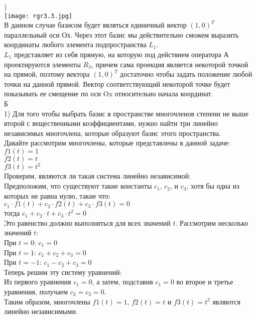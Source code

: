 \documentclass{article}
\begin{document}
    ) \\
    \texttt{[image: rgr3.3.jpg]}
    \\
    В данном случае базисом будет являться единичный вектор $(1, 0)^T$
    параллельный оси Ох. Через этот базис мы действительно сможем выразить координаты любого элемента подпространства $L_1$. \\ $L_1$ представляет из себя прямую, на которую под действием оператора $А$ проектируются элементы $R_3$, причем сама проекция является некоторой
    точкой на прямой, поэтому вектора $(1, 0)^T$ достаточно чтобы задать
    положение любой точки на данной прямой. Вектор соответствующий
    некоторой точке будет показывать ее смещение по оси Ox относительно
    начала координат. \\
    Б\\
    1) Для того чтобы выбрать базис в пространстве многочленов степени не
    выше второй с вещественными коэффициентами, нужно найти три
    линейно независимых многочлена, которые образуют базис этого
    пространства.\\
    Давайте рассмотрим многочлены, которые представлены в данной
    задаче:\\
    $f1(t) = 1$\\
    $f2(t) = t$\\
    $f3(t) = t^2$\\
    Проверим, являются ли такая система линейно независимой:\\
    Предположим, что существуют такие константы $c_1$, $c_2$, и $c_3$, хотя бы одна
    из которых не равна нулю, такие что:\\
    $c_1  \cdot  f1(t) + c_2  \cdot  f2(t) + c_3  \cdot  f3(t)=0$\\
    тогда $c_1 + c_2  \cdot  t+c_3  \cdot  t^2 = 0$\\
    Это равенство должно выполняться для всех значений $t$. Рассмотрим
    несколько значений $t$:\\
    При $t = 0$: $c_1 = 0$\\
    При $t = 1$: $c_1 + c_2 + c_3 = 0$\\
    При $t =-1$: $c_1 - c_2 + c_3 = 0$\\
    Теперь решим эту систему уравнений:\\
    Из первого уравнения $c_1 = 0$, а затем, подставив $c_1 = 0$ во второе и третье
    уравнения, получаем $c_2 = c_3 = 0$.\\
    Таким образом, многочлены $f1(t)=1$, $f2(t)=t$ и $f3(t)=t^2$ являются линейно
    независимыми.\\
\end{document}
